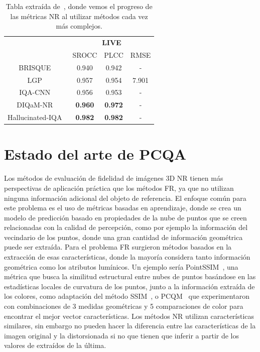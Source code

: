 \begin{table}[htp]
  \tiny
    \centering
    \begin{tabular}{|c|c|c|c|}
    \hline 
    \rowcolor[HTML]{FFC702}
    \cellcolor[HTML]{FFC702} & \multicolumn{3}{c|}{\cellcolor[HTML]{FFC702}\textbf{LIVE}} \\ \cline{2-4}
    \rowcolor[HTML]{FFC702}
      \multirow{-2}{*}{\textbf{Métrica}} & SROCC & PLCC & RMSE \\
    \hline
                          BRISQUE~\cite{BRISQUE} & 0.940 & 0.942 & - \\
                           LGP~\cite{LGP} & 0.957 & 0.954 & 7.901 \\
                           IQA-CNN~\cite{IQA-CNN} & 0.956 & 0.953 & - \\
                           DIQaM-NR~\cite{DIQaM} & \textbf{0.960} & \textbf{0.972} & - \\
                           Hallucinated-IQA~\cite{Hallucinated-IQA} & \textbf{0.982} & \textbf{0.982} & - \\
                          \hline
  \end{tabular}
  \caption[Tablas estado del arte NR-IQA.]{Tabla extraída de~\cite{SurveyOf2D3DMetrics}, 
    donde vemos el progreso de las métricas NR al utilizar métodos cada vez más complejos.}
  \label{tab:SOTANRIQA}
\end{table}

\section{Estado del arte de PCQA}
Los métodos de evaluación de fidelidad de imágenes 3D NR tienen más perspectivas 
de aplicación práctica que los métodos FR, ya que no utilizan ninguna información 
adicional del objeto de referencia.
El enfoque común para este problema es el uso de métricas basadas en 
aprendizaje, donde se crea un modelo de predicción basado en propiedades de la 
nube de puntos que se creen relacionadas con la calidad de percepción, 
como por ejemplo la información del vecindario de los puntos, 
donde una gran cantidad de información geométrica 
puede ser extraída. 
Para el problema FR surgieron métodos basados en la extracción 
de esas características, donde la 
mayoría considera tanto información geométrica como los atributos lumínicos.
Un ejemplo sería PointSSIM~\cite{PointSSIM}, una métrica que busca la similitud estructural entre nubes de puntos basándose en
las estadísticas locales de curvatura de los puntos, junto a la información 
extraída de los colores, como adaptación del método SSIM~\cite{SSIM}, o 
PCQM~\cite{PCQM} que experimentaron con combinaciones de 3 medidas geométricas 
y 5 comparaciones de color para encontrar el mejor vector características.
Los métodos NR utilizan características similares, sin embargo no pueden 
hacer la diferencia entre las características de la imagen original y la 
distorsionada si no que tienen que inferir a partir de los valores de extraídos 
de la última.

